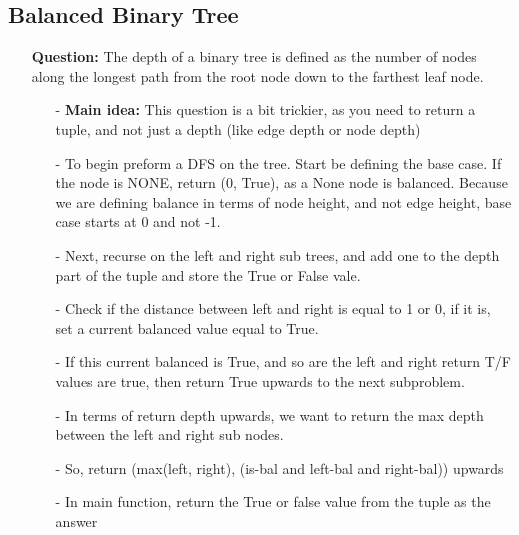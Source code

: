 \documentclass[12pt]{article}
\begin{document}
\subsection{Balanced Binary Tree}
\begin{enumerate}
  \item[] \textbf{Question:} The depth of a binary tree is defined as the number of nodes along the longest path from the root node down to the farthest leaf node.

    \begin{enumerate}
      \item[-] \textbf{Main idea:} This question is a bit trickier, as you need to return a tuple, and not just a depth (like edge depth or node depth)
      \item[-] To begin preform a DFS on the tree. Start be defining the base case. If the node is NONE, return (0, True), as a None node is balanced. Because we are defining balance in terms of node height, and not edge height, base case starts at 0 and not -1.
      \item[-] Next, recurse on the left and right sub trees, and add one to the depth part of the tuple and store the True or False vale. 
      \item[-] Check if the distance between left and right is equal to 1 or 0, if it is, set a current balanced value equal to True. 
      \item[-] If this current balanced is True, and so are the left and right return T/F values are true, then return True upwards to the next subproblem. 
      \item[-] In terms of return depth upwards, we want to return the max depth between the left and right sub nodes.
      \item[-] So, return (max(left, right), (is-bal and left-bal and right-bal)) upwards
      \item[-] In main function, return the True or false value from the tuple as the answer


    \end{enumerate}
\end{enumerate}
\end{document}
